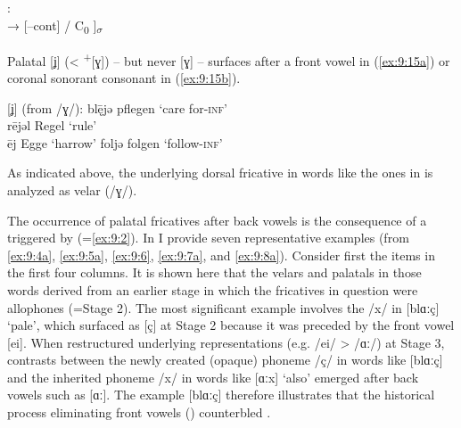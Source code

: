 \ea%
\label{ex:9:14}: \smallskip\\

 → [--cont] /   {\longrule} C\textsubscript{0} ]\textsubscript{${\sigma}$}
\z 

Palatal [ʝ] (<  \textsuperscript{+}[ɣ]) -- but never [ɣ] -- surfaces after a front vowel in (\ref{ex:9:15a}) or coronal sonorant consonant in (\ref{ex:9:15b}).\largerpage

\ea%
\label{ex:9:15} [ʝ] (from /ɣ/):
\ea\label{ex:9:15a} bl\={ę}jə \tab [plɛːʝə] \tab pflegen \tab ‘care for-\textsc{inf}’ \\
    rējəl     \tab [reːʝəl] \tab Regel   \tab ‘rule’                  \\
    ēj        \tab [eːʝ]    \tab Egge    \tab ‘harrow’                
\ex\label{ex:9:15b} foljə     \tab [folʝə]  \tab folgen  \tab ‘follow-\textsc{inf}’   
  \z
\z 

As indicated above, the underlying dorsal fricative in words like the ones in  is analyzed as velar (/ɣ/).

The occurrence of palatal fricatives after back vowels is the consequence of a  triggered by  (=\ref{ex:9:2}). In  I provide seven representative examples (from \ref{ex:9:4a}, \ref{ex:9:5a}, \ref{ex:9:6}, \ref{ex:9:7a}, and \ref{ex:9:8a}). Consider first the items in the first four columns. It is shown here that the velars and palatals in those words derived from an earlier stage in which the fricatives in question were allophones (=Stage 2). The most significant example involves the /x/ in [blɑːç] ‘pale’, which surfaced as [ç] at Stage 2 because it was preceded by the front vowel [ei]. When  restructured underlying representations (e.g. /ei/ > /ɑː/) at Stage 3, contrasts between the newly created (opaque) phoneme /ç/ in words like [blɑːç] and the inherited phoneme /x/ in words like [ɑːx] ‘also’ emerged after back vowels such as [ɑː]. The example [blɑːç] therefore illustrates that the historical process eliminating front vowels () counterbled .\largerpage


